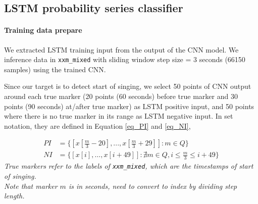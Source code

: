 \documentclass{article}
\begin{document}
    \subsection{LSTM probability series classifier}
    \paragraph*{Training data prepare}
    We extracted LSTM training input from the output of the CNN model. We inference data in \lstinline|xxm_mixed| with sliding window step size = 3 seconds (66150 samples) using the trained CNN.

    Since our target is to detect start of singing, we select 50 points of CNN output around each true marker (20 points (60 seconds) before true marker and 30 points (90 seconds) at/after true marker) as LSTM positive input, and 50 points where there is no true marker in its range as LSTM negative input. In set notation, they are defined in Equation \ref{eq_PI} and \ref{eq_NI}, 
    
    \begin{align}
        PI &= \{ [x [\frac{m}{3}-20], ..., x[\frac{m}{3}+29]]: m \in Q \} \label{eq_PI} \\
        NI &= \{ [x[i], \dots, x[i+49]]: \nexists m \in Q, i \le \frac{m}{3} \le i+49  \} \label{eq_NI}
    \end{align}
    \textit{True markers refer to the labels of \lstinline|xxm_mixed|, which are the timestamps of start of singing.\\
    Note that marker $m$ is in seconds, need to convert to index by dividing step length.}
\end{document}
